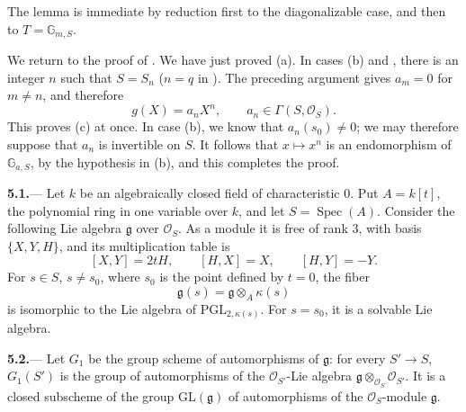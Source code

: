 The lemma is immediate by reduction first to the diagonalizable
case, and then to \(T=\mathbb G_{m,S}\).

We return to the proof of .  We have just proved
\textup{(a)}.  In cases \textup{(b)} and \textup{}, there is an
integer \(n\) such that \(S=S_n\) \textup{(\(n=q\) in
\textup{})}.  The preceding argument gives \(a_m=0\) for
\(m\ne n\), and therefore
\[
  g(X)=a_nX^n,
  \qquad
  a_n\in\Gamma(S,\mathcal O_S).
\]
This proves \textup{(c)} at once.  In case \textup{(b)}, we know
that \(a_n(s_0)\ne0\); we may therefore suppose that \(a_n\) is
invertible on \(S\).  It follows that \(x\longmapsto x^n\) is an
endomorphism of \(\mathbb G_{a,S}\), by the hypothesis in
\textup{(b)}, and this completes the proof.




\par\medskip\noindent
\textbf{5.1.}---
Let \(k\) be an algebraically closed field of characteristic \(0\).
Put \(A=k[t]\), the polynomial ring in one variable over \(k\), and
let \(S=\operatorname{Spec}(A)\).  Consider the following Lie algebra
\(\mathfrak g\) over \(\mathcal O_S\).  As a module it is free of
rank \(3\), with basis \(\{X,Y,H\}\), and its multiplication table is
\[
  [X,Y]=2tH,
  \qquad
  [H,X]=X,
  \qquad
  [H,Y]=-Y.
\]
For \(s\in S\), \(s\ne s_0\), where \(s_0\) is the point defined by
\(t=0\), the fiber
\[
  \mathfrak g(s)=\mathfrak g\otimes_A\kappa(s)
\]
is isomorphic to the Lie algebra of
\(\mathrm{PGL}_{2,\kappa(s)}\).  For \(s=s_0\), it is a solvable Lie
algebra.

\par\medskip\noindent
\textbf{5.2.}---
Let \(G_1\) be the group scheme of automorphisms of \(\mathfrak g\):
for every \(S'\to S\), \(G_1(S')\) is the group of automorphisms of
the \(\mathcal O_{S'}\)-Lie algebra
\(\mathfrak g\otimes_{\mathcal O_S}\mathcal O_{S'}\).  It is a closed
subscheme of the group \(\mathrm{GL}(\mathfrak g)\) of automorphisms
of the \(\mathcal O_S\)-module \(\mathfrak g\).

